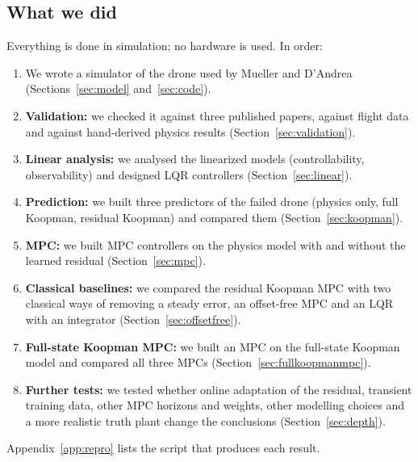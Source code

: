 \subsection{What we did}
Everything is done in simulation; no hardware is used. In order:
\begin{enumerate}
  \item We wrote a simulator of the drone used by Mueller and D'Andrea (Sections~\ref{sec:model} and~\ref{sec:code}).
  \item \textbf{Validation:} we checked it against three published papers, against flight data and against hand-derived physics results (Section~\ref{sec:validation}).
  \item \textbf{Linear analysis:} we analysed the linearized models (controllability, observability) and designed LQR controllers (Section~\ref{sec:linear}).
  \item \textbf{Prediction:} we built three predictors of the failed drone (physics only, full Koopman, residual Koopman) and compared them (Section~\ref{sec:koopman}).
  \item \textbf{MPC:} we built MPC controllers on the physics model with and without the learned residual (Section~\ref{sec:mpc}).
  \item \textbf{Classical baselines:} we compared the residual Koopman MPC with two classical ways of removing a steady error, an offset-free MPC and an LQR with an integrator (Section~\ref{sec:offsetfree}).
  \item \textbf{Full-state Koopman MPC:} we built an MPC on the full-state Koopman model and compared all three MPCs (Section~\ref{sec:fullkoopmanmpc}).
  \item \textbf{Further tests:} we tested whether online adaptation of the residual, transient training data, other MPC horizons and weights, other modelling choices and a more realistic truth plant change the conclusions (Section~\ref{sec:depth}).
\end{enumerate}
Appendix~\ref{app:repro} lists the script that produces each result.

